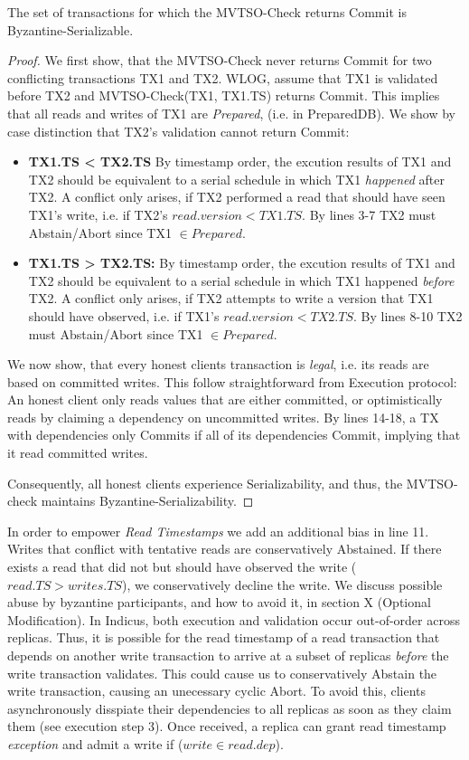\begin{theorem}
The set of transactions for which the MVTSO-Check returns Commit is Byzantine-Serializable. 
\end{theorem}
\begin{proof}
We first show, that the MVTSO-Check never returns Commit for two conflicting transactions TX1 and TX2.
WLOG, assume that TX1 is validated before TX2 and MVTSO-Check(TX1, TX1.TS) returns Commit. This implies that all reads and writes of TX1 are \textit{Prepared}, (i.e. in PreparedDB).
We show by case distinction that TX2's validation cannot return Commit:
\begin{itemize}

\item \textbf{TX1.TS < TX2.TS} By timestamp order, the excution results of TX1 and TX2 should be equivalent to a serial schedule in which TX1 \textit{happened} after TX2. A conflict only arises, if TX2 performed a read that should have seen TX1's write, i.e. if TX2's $read.version < TX1.TS$. By lines 3-7 TX2 must Abstain/Abort since TX1 $\in Prepared$. 

\item \textbf{TX1.TS > TX2.TS:} By timestamp order, the excution results of TX1 and TX2 should be equivalent to a serial schedule in which TX1 happened \textit{before} TX2. A conflict only arises, if TX2 attempts to write a version that TX1 should have observed, i.e. if TX1's $read.version < TX2.TS$. By lines 8-10 TX2 must Abstain/Abort since TX1 $\in Prepared$. 
\end{itemize}

We now show, that every honest clients transaction is \textit{legal}, i.e. its reads are based on committed writes. This follow straightforward from Execution protocol: An honest client only reads values that are either committed, or optimistically reads by claiming a dependency on uncommitted writes. By lines 14-18, a TX with dependencies only Commits if all of its dependencies Commit, implying that it read committed writes.

Consequently, all honest clients experience Serializability, and thus, the MVTSO-check maintains Byzantine-Serializability.
\end{proof}

In order to empower \textit{Read Timestamps} we add an additional bias in line 11. Writes that conflict with tentative reads are conservatively Abstained. If there exists a read that did not but should have observed the write ($read.TS > writes.TS$), we conservatively decline the write. We discuss possible abuse by byzantine participants, and how to avoid it, in section X (Optional Modification). In Indicus, both execution and validation occur out-of-order across replicas. Thus, it is possible for the read timestamp of a read transaction that depends on another write transaction to arrive at a subset of replicas \textit{before} the write transaction validates. This could cause us to conservatively Abstain the write transaction, causing an unecessary cyclic Abort. To avoid this, clients asynchronously disspiate their dependencies to all replicas as soon as they claim them (see execution step 3). Once received, a replica can grant read timestamp \textit{exception} and admit a write if ($write \in read.dep$).

